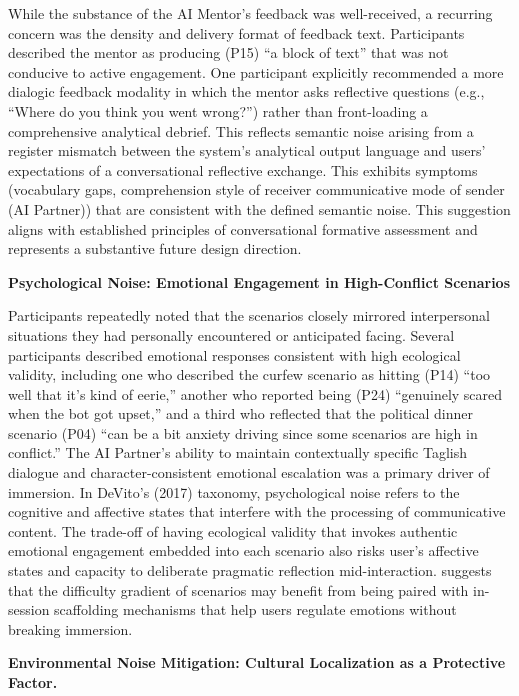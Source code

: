 While the substance of the AI Mentor's feedback was well-received, 
a recurring concern was the density and delivery format of feedback text. Participants described the mentor 
as producing (P15) ``a block of text'' that was not conducive to active engagement. One participant explicitly 
recommended a more dialogic feedback modality in which the mentor asks reflective questions (e.g., ``Where 
do you think you went wrong?'') rather than front-loading a comprehensive analytical debrief. This reflects semantic noise arising from a 
register mismatch between the system's analytical output language and users' expectations of a conversational reflective exchange. This exhibits symptoms (vocabulary gaps, comprehension style of receiver
communicative mode of sender (AI Partner)) that are consistent with the defined semantic noise. This suggestion 
aligns with established principles of conversational formative assessment and represents a substantive future 
design direction.

\noindent\textbf{Psychological Noise: Emotional Engagement in High-Conflict Scenarios}

Participants repeatedly noted that the scenarios closely mirrored interpersonal 
situations they had personally encountered or anticipated facing. Several participants 
described emotional responses consistent with high ecological validity, including one 
who described the curfew scenario as hitting (P14) ``too well that it's kind of eerie,'' 
another who reported being (P24) ``genuinely scared when the bot got upset,'' and a 
third who reflected that the political dinner scenario (P04) ``can be a bit anxiety 
driving since some scenarios are high in conflict.'' The AI Partner's ability to 
maintain contextually specific Taglish dialogue and character-consistent emotional 
escalation was a primary driver of immersion. In DeVito's (2017) taxonomy, 
psychological noise refers to the cognitive and affective states that interfere with 
the processing of communicative content. The trade-off of having ecological validity 
that invokes authentic emotional engagement embedded into each scenario also risks user's
affective states and capacity to deliberate pragmatic reflection mid-interaction.
suggests that the difficulty gradient of scenarios may benefit from being paired 
with in-session scaffolding mechanisms that help users regulate emotions without 
breaking immersion.

\noindent\textbf{Environmental Noise Mitigation: Cultural Localization as a 
Protective Factor.}

